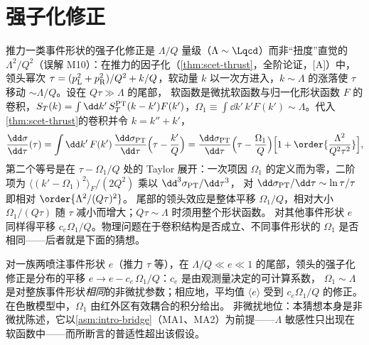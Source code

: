 \section{强子化修正}\label{sec:jets-hadronization}

推力一类事件形状的强子化修正是 $\Lambda/Q$ 量级（$\Lambda\sim\Lqcd$）而非“扭度”直觉的 $\Lambda^2/Q^2$（误解 M10）：在推力的因子化（\cref{thm:scet-thrust}，全阶论证，[A]）中，
领头幂次 $\tau=(p_{\rm L}^2+p_{\rm R}^2)/Q^2+k/Q$，软动量 $k$ 以一次方进入，$k\sim\Lambda$ 的涨落使 $\tau$ 移动 $\sim\Lambda/Q$。设在 $Q\tau\gg\Lambda$ 的尾部，
软函数是微扰软函数与归一化形状函数 $F$ 的卷积，$S_T(k)=\int\dd k'\,S_T^{\rm PT}(k-k')F(k')$，$\Omega_1\equiv\int\dd k'\,k'F(k')\sim\Lambda$。代入\cref{thm:scet-thrust}的卷积并令 $k=k''+k'$，
\begin{equation}\label{eq:jets-shift-derivation}
\frac{\dd\sigma}{\dd\tau}(\tau)=\int\dd k'\,F(k')\,\frac{\dd\sigma_{\rm PT}}{\dd\tau}\Big(\tau-\frac{k'}{Q}\Big)
=\frac{\dd\sigma_{\rm PT}}{\dd\tau}\Big(\tau-\frac{\Omega_1}{Q}\Big)\Big[1+\order{\frac{\Lambda^2}{Q^2\tau^2}}\Big],
\end{equation}
第二个等号是在 $\tau-\Omega_1/Q$ 处的 Taylor 展开：一次项因 $\Omega_1$ 的定义而为零，二阶项为 $\langle(k'-\Omega_1)^2\rangle_F/(2Q^2)$ 乘以 $\dd^3\sigma_{\rm PT}/\dd\tau^3$，
对 $\dd\sigma_{\rm PT}/\dd\tau\sim\ln\tau/\tau$ 即相对 $\order{\Lambda^2/(Q\tau)^2}$。
尾部的领头效应是整体平移 $\Omega_1/Q$，相对大小 $\Omega_1/(Q\tau)$ 随 $\tau$ 减小而增大；$Q\tau\sim\Lambda$ 时须用整个形状函数\cite{Korchemsky:1999kt,Bauer:2003di}。
对其他事件形状 $e$ 同样得平移 $c_e\Omega_1/Q$。物理问题在于卷积结构是否成立、不同事件形状的 $\Omega_1$ 是否相同——后者就是下面的猜想。

\begin{conjecture}\label{conj:jets-hadronization}
对一族两喷注事件形状 $e$（推力 $\tau$ 等），在 $\Lambda/Q\ll e\ll1$ 的尾部，领头的强子化修正是分布的平移 $e\to e-c_e\,\Omega_1/Q$：$c_e$ 是由观测量决定的可计算系数，
$\Omega_1\sim\Lambda$ 是对整族事件形状\emph{相同}的非微扰参数；相应地，平均值 $\langle e\rangle$ 受到 $c_e\Omega_1/Q$ 的修正。在色散模型中，$\Omega_1$ 由红外区有效耦合的积分给出\cite{DokshitzerWebber1995}。
非微扰地位：本猜想本身是非微扰陈述，它以\cref{asm:intro-bridge}（MA1、MA2）为前提——$\Lambda$ 敏感性只出现在软函数中——而所断言的普适性超出该假设。
\end{conjecture}

